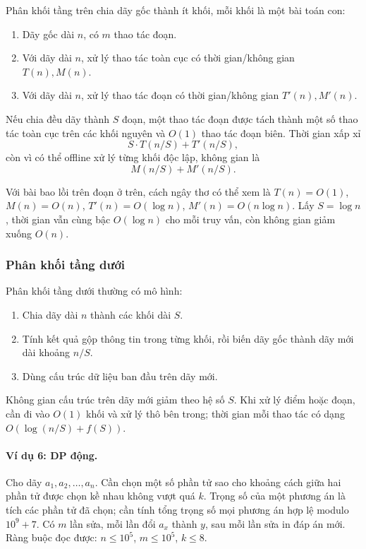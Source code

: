 \documentclass[11pt]{article}
\begin{document}
Phân khối tầng trên chia dãy gốc thành ít khối, mỗi khối là một bài toán con:
\begin{enumerate}
  \item Dãy gốc dài $n$, có $m$ thao tác đoạn.
  \item Với dãy dài $n$, xử lý thao tác toàn cục có thời gian/không gian
  $T(n),M(n)$.
  \item Với dãy dài $n$, xử lý thao tác đoạn có thời gian/không gian
  $T'(n),M'(n)$.
\end{enumerate}
Nếu chia đều dãy thành $S$ đoạn, một thao tác đoạn được tách thành một số thao
tác toàn cục trên các khối nguyên và $O(1)$ thao tác đoạn biên. Thời gian xấp
xỉ
\[
  S\cdot T(n/S)+T'(n/S),
\]
còn vì có thể offline xử lý từng khối độc lập, không gian là
\[
  M(n/S)+M'(n/S).
\]

Với bài bao lồi trên đoạn ở trên, cách ngây thơ có thể xem là
$T(n)=O(1)$, $M(n)=O(n)$, $T'(n)=O(\log n)$,
$M'(n)=O(n\log n)$. Lấy $S=\log n$, thời gian vẫn cùng bậc $O(\log n)$ cho mỗi
truy vấn, còn không gian giảm xuống $O(n)$.

\subsubsection{Phân khối tầng dưới}

Phân khối tầng dưới thường có mô hình:
\begin{enumerate}
  \item Chia dãy dài $n$ thành các khối dài $S$.
  \item Tính kết quả gộp thông tin trong từng khối, rồi biến dãy gốc thành dãy
  mới dài khoảng $n/S$.
  \item Dùng cấu trúc dữ liệu ban đầu trên dãy mới.
\end{enumerate}
Không gian cấu trúc trên dãy mới giảm theo hệ số $S$. Khi xử lý điểm hoặc
đoạn, cần đi vào $O(1)$ khối và xử lý thô bên trong; thời gian mỗi thao tác có
dạng $O(\log(n/S)+f(S))$.

\paragraph{Ví dụ 6: DP động.}
Cho dãy $a_1,a_2,\ldots,a_n$. Cần chọn một số phần tử sao cho khoảng cách giữa
hai phần tử được chọn kề nhau không vượt quá $k$. Trọng số của một phương án là
tích các phần tử đã chọn; cần tính tổng trọng số mọi phương án hợp lệ modulo
$10^9+7$. Có $m$ lần sửa, mỗi lần đổi $a_x$ thành $y$, sau mỗi lần sửa in đáp
án mới. Ràng buộc đọc được: $n\le 10^5$, $m\le 10^5$, $k\le 8$.
\end{document}
